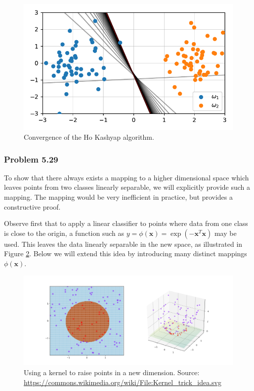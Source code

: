 \documentclass[12pt, a4paper]{article}
\newcommand{\vect}[1]{\bm{#1}}
\begin{document}
\begin{easylist}[enumerate]
\begin{figure}[ht!]
	\centering
	\includegraphics[width=0.5\linewidth]{figs/duda_ch5_prob27_b}
	\caption{Convergence of the Ho Kashyap algorithm.}
	\label{fig:duda_ch5_prob27_b}
\end{figure}

\end{easylist}


\subsubsection*{Problem 5.29}
To show that there always exists a mapping to a higher dimensional space which leaves points from two classes linearly separable, we will explicitly provide such a mapping.
The mapping would be very inefficient in practice, but provides a constructive proof.

Observe first that to apply a linear classifier to points where data from one class is close to the origin, a function such as $y = \phi (\vect{x}) = \exp(- \vect{x}^T \vect{x})$ may be used.
This leaves the data linearly separable in the new space, as illustrated in Figure \ref{fig:1024px_Kernel_trick_idea_svg_wikipedia}.
Below we will extend this idea by introducing many distinct mappings $\phi (\vect{x})$.
\begin{figure}
	\centering
	\includegraphics[width=0.85\linewidth]{figs/1024px_Kernel_trick_idea_svg_wikipedia}
	\caption{Using a kernel to raise points in a new dimension. Source: \url{https://commons.wikimedia.org/wiki/File:Kernel_trick_idea.svg}}
	\label{fig:1024px_Kernel_trick_idea_svg_wikipedia}
\end{figure}
\end{document}
